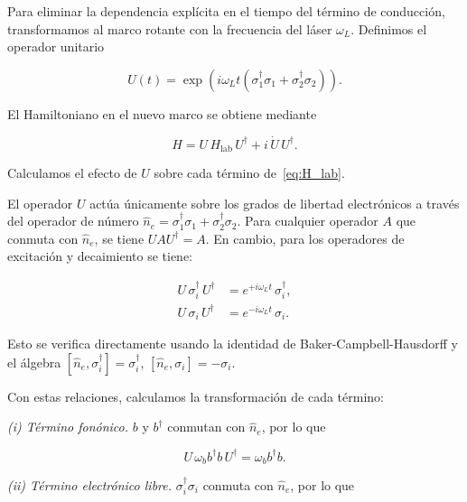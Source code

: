 \documentclass[12pt]{article}
\begin{document}
	Para eliminar la dependencia expl\'icita en el tiempo del t\'ermino de
	conducci\'on, transformamos al marco rotante con la frecuencia del l\'aser
	$\omega_L$. Definimos el operador unitario
	
	\begin{equation}
		U(t) = \exp\!\left(i\omega_L t \left(\sigma_1^\dagger\sigma_1
		+ \sigma_2^\dagger\sigma_2\right)\right).
		\label{eq:U}
	\end{equation}
	
	El Hamiltoniano en el nuevo marco se obtiene mediante
	
	\begin{equation}
		H = U\,H_{\mathrm{lab}}\,U^\dagger + i\,\dot{U}\,U^\dagger.
		\label{eq:H_rotante_def}
	\end{equation}
	
	Calculamos el efecto de $U$ sobre cada t\'ermino de~\eqref{eq:H_lab}.
	
	\medskip
	\noindent
	El operador $U$ act\'ua \'unicamente sobre los grados de libertad electr\'onicos
	a trav\'es del operador de n\'umero $\hat{n}_e = \sigma_1^\dagger\sigma_1 +
	\sigma_2^\dagger\sigma_2$. Para cualquier operador $A$ que conmuta con
	$\hat{n}_e$, se tiene $U A U^\dagger = A$. En cambio, para los operadores de
	excitaci\'on y decaimiento se tiene:
	
	\begin{align}
		U\,\sigma_i^\dagger\,U^\dagger &= e^{+i\omega_L t}\,\sigma_i^\dagger,
		\label{eq:transf_sigmadag}\\
		U\,\sigma_i\,U^\dagger &= e^{-i\omega_L t}\,\sigma_i.
		\label{eq:transf_sigma}
	\end{align}
	
	Esto se verifica directamente usando la identidad de Baker-Campbell-Hausdorff y
	el \'algebra $[\hat{n}_e, \sigma_i^\dagger] = \sigma_i^\dagger$,
	$[\hat{n}_e, \sigma_i] = -\sigma_i$.
	
	\medskip
	\noindent
	Con estas relaciones, calculamos la transformaci\'on de cada t\'ermino:
	
	\medskip
	\noindent
	\textit{(i) T\'ermino fon\'onico.}
	$b$ y $b^\dagger$ conmutan con $\hat{n}_e$, por lo que
	
	\begin{equation}
		U\,\omega_b b^\dagger b\,U^\dagger = \omega_b b^\dagger b.
	\end{equation}
	
	\noindent
	\textit{(ii) T\'ermino electr\'onico libre.}
	$\sigma_i^\dagger\sigma_i$ conmuta con $\hat{n}_e$, por lo que
	
\end{document}
